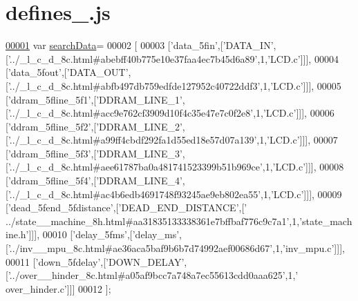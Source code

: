 \hypertarget{defines__3_8js_source}{}\section{defines\+\_.\+js}
\label{defines__3_8js_source}

\begin{DoxyCode}
\hypertarget{defines__3_8js_source.tex_l00001}{}\hyperlink{defines__3_8js_ad01a7523f103d6242ef9b0451861231e}{00001} var \hyperlink{defines__3_8js_ad01a7523f103d6242ef9b0451861231e}{searchData}=
00002 [
00003   [\textcolor{stringliteral}{'data\_5fin'},[\textcolor{stringliteral}{'DATA\_IN'},[\textcolor{stringliteral}{'../\_l\_c\_d\_8c.html#abebff40b775e10e37faa4ec7b45d6a89'},1,\textcolor{stringliteral}{'LCD.c'}]]],
00004   [\textcolor{stringliteral}{'data\_5fout'},[\textcolor{stringliteral}{'DATA\_OUT'},[\textcolor{stringliteral}{'../\_l\_c\_d\_8c.html#abfb497db759edfde127952c40722ddf3'},1,\textcolor{stringliteral}{'LCD.c'}]]],
00005   [\textcolor{stringliteral}{'ddram\_5fline\_5f1'},[\textcolor{stringliteral}{'DDRAM\_LINE\_1'},[\textcolor{stringliteral}{'../\_l\_c\_d\_8c.html#acc9e762cf3909d10f4c35e47e7c0f2e8'},1,\textcolor{stringliteral}{'LCD.c'}]]],
00006   [\textcolor{stringliteral}{'ddram\_5fline\_5f2'},[\textcolor{stringliteral}{'DDRAM\_LINE\_2'},[\textcolor{stringliteral}{'../\_l\_c\_d\_8c.html#a99ff4cbdf292fa1d55ed18e57d07a139'},1,\textcolor{stringliteral}{'LCD.c'}]]],
00007   [\textcolor{stringliteral}{'ddram\_5fline\_5f3'},[\textcolor{stringliteral}{'DDRAM\_LINE\_3'},[\textcolor{stringliteral}{'../\_l\_c\_d\_8c.html#aee61787ba0a481741523399b51b969ce'},1,\textcolor{stringliteral}{'LCD.c'}]]],
00008   [\textcolor{stringliteral}{'ddram\_5fline\_5f4'},[\textcolor{stringliteral}{'DDRAM\_LINE\_4'},[\textcolor{stringliteral}{'../\_l\_c\_d\_8c.html#ac4b6edb4691748f93245ae9eb802ea55'},1,\textcolor{stringliteral}{'LCD.c'}]]],
00009   [\textcolor{stringliteral}{'dead\_5fend\_5fdistance'},[\textcolor{stringliteral}{'DEAD\_END\_DISTANCE'},[\textcolor{stringliteral}{'
      ../state\_\_machine\_8h.html#aa31835133338361e7bffbaf776c9c7a1'},1,\textcolor{stringliteral}{'state\_machine.h'}]]],
00010   [\textcolor{stringliteral}{'delay\_5fms'},[\textcolor{stringliteral}{'delay\_ms'},[\textcolor{stringliteral}{'../inv\_\_mpu\_8c.html#ae36aca5baf9b6b7d74992aef00686d67'},1,\textcolor{stringliteral}{'inv\_mpu.c'}]]],
00011   [\textcolor{stringliteral}{'down\_5fdelay'},[\textcolor{stringliteral}{'DOWN\_DELAY'},[\textcolor{stringliteral}{'../over\_\_hinder\_8c.html#a05af9bcc7a748a7ec55613cdd0aaa625'},1,\textcolor{stringliteral}{'
      over\_hinder.c'}]]]
00012 ];
\end{DoxyCode}
